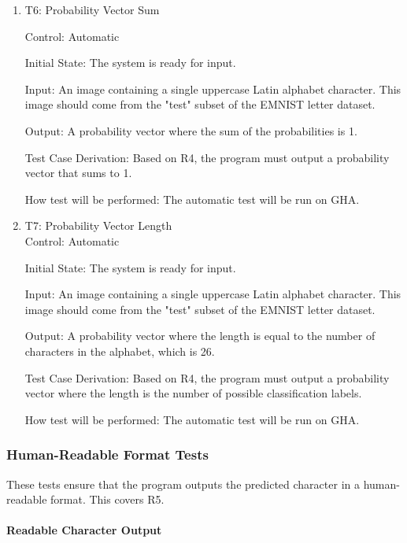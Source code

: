 \documentclass[12pt, titlepage]{article}
\begin{document}
\begin{enumerate}

\item{T6: Probability Vector Sum\\}

Control: Automatic

Initial State: The \progname{} system is ready for input.

Input: An image containing a single uppercase Latin alphabet character. This
image should come from the "test" subset of the EMNIST letter dataset.

Output: A probability vector where the sum of the probabilities is 1.

Test Case Derivation: Based on R4, the program must output a probability vector
that sums to 1.

How test will be performed: The automatic test will be run on GHA.

\item{T7: Probability Vector Length\\}
Control: Automatic

Initial State: The \progname{} system is ready for input.

Input: An image containing a single uppercase Latin alphabet character. This
image should come from the "test" subset of the EMNIST letter dataset.

Output: A probability vector where the length is equal to the number of
characters in the alphabet, which is 26.

Test Case Derivation: Based on R4, the program must output a probability vector
where the length is the number of possible classification labels.

How test will be performed: The automatic test will be run on GHA.

\end{enumerate}

\subsubsection{Human-Readable Format Tests}

These tests ensure that the program outputs the predicted character in a
human-readable format. This covers R5.

\paragraph{Readable Character Output}
\end{document}

